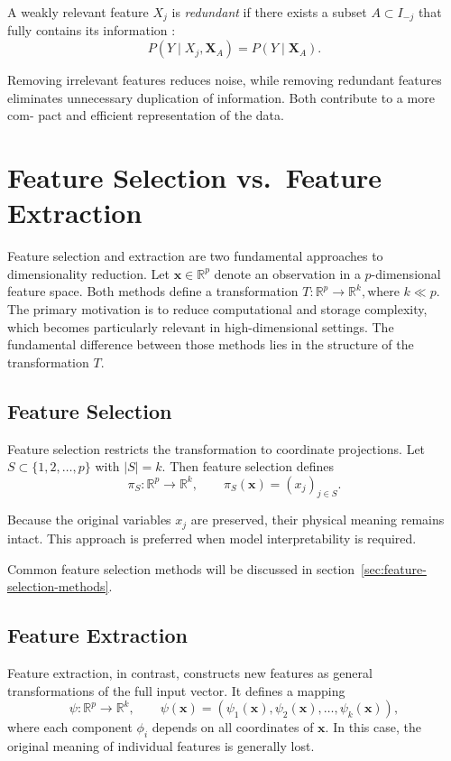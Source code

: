 A weakly relevant feature $X_j$ is \emph{redundant} if there exists a subset $A \subset I_{-j}$ that fully contains its information \cite{yu2004}:
\begin{equation*}
P(Y \mid X_j, \mathbf{X}_A) = P(Y \mid \mathbf{X}_A).
\end{equation*}

Removing irrelevant features reduces noise, while removing redundant features
eliminates unnecessary duplication of information. Both contribute to a more com-
pact and efficient representation of the data.

\section{Feature Selection vs.\ Feature Extraction}

Feature selection and extraction are two fundamental approaches to dimensionality reduction. Let $\mathbf{x} \in \mathbb{R}^p$ denote an observation in a $p$-dimensional feature space. Both methods define a transformation
$T : \mathbb{R}^p \to \mathbb{R}^k,\text{where } k \ll p$. The primary motivation is to reduce computational and storage complexity, which becomes particularly relevant in high-dimensional settings. The fundamental difference between those methods lies in the structure of the transformation $T$.

\subsection*{Feature Selection}
Feature selection restricts the transformation to coordinate projections. Let $S \subset \{1,2,\dots, p\}$ with $|S| = k$. Then feature selection defines
\begin{equation*}
    \pi_S : \mathbb{R}^p \to \mathbb{R}^k, 
    \qquad 
    \pi_S(\mathbf{x}) = (x_j)_{j \in S}.
\end{equation*}

Because the original variables $x_j$ are preserved, their physical meaning remains intact. This approach is preferred when model interpretability is required.

Common feature selection methods will be discussed in section~\ref{sec:feature-selection-methods}. 

\subsection*{Feature Extraction}
Feature extraction, in contrast, constructs new features as general transformations of the full input vector. It defines a mapping
\begin{equation*}
    \psi : \mathbb{R}^p \to \mathbb{R}^k,\qquad \psi(\mathbf{x}) = (\psi_1(\mathbf{x}),\psi_2(\mathbf{x}), \dots, \psi_k(\mathbf{x})),
\end{equation*}
where each component $\phi_i$ depends on all coordinates of $\mathbf{x}$. In this case, the original meaning of individual features is generally lost.

